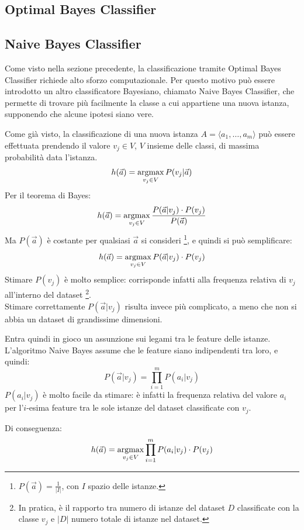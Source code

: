 \subsection{Optimal Bayes Classifier}

\subsection{Naive Bayes Classifier}
Come visto nella sezione precedente, la classificazione tramite Optimal Bayes
Classifier richiede alto sforzo computazionale.
Per questo motivo può essere introdotto un altro classificatore Bayesiano,
chiamato Naive Bayes Classifier, che permette di trovare più facilmente la
classe a cui appartiene una nuova istanza, supponendo che alcune ipotesi siano
vere.

Come già visto, la classificazione di una nuova istanza
$A = \langle a_1, \ldots, a_m \rangle$ può essere effettuata prendendo il valore
$v_j \in V$, $V$ insieme delle classi, di massima probabilità data l'istanza.
\[
    h(\Vec{a}) = \operatorname*{argmax}_{v_j \in V} P(v_j | \Vec{a})
\]
Per il teorema di Bayes:
\[
    h(\Vec{a}) = \operatorname*{argmax}\limits_{v_j \in V} \frac{P(\Vec{a} | v_j) \cdot P(v_j)}{P(\Vec{a})}
\]
Ma $P(\Vec{a})$ è costante per qualsiasi
$\Vec{a}$ si consideri \footnote{$P(\Vec{a}) = \frac{1}{|I|}$,
con $I$ spazio delle istanze.}, e quindi si può semplificare:
\[
    h(\Vec{a}) = \operatorname*{argmax}\limits_{v_j \in V} P(\Vec{a} | v_j) \cdot P(v_j)
\]
Stimare $P(v_j)$ è molto semplice: corrisponde infatti alla frequenza relativa
di $v_j$ all'interno del dataset \footnote{In pratica, è il rapporto tra numero
di istanze del dataset $D$ classificate con la classe $v_j$ e $|D|$ numero
totale di istanze nel dataset.}.\\
Stimare correttamente $P(\Vec{a} | v_j)$ risulta invece più complicato, a meno
che non si abbia un dataset di grandissime dimensioni.

Entra quindi in gioco un assunzione sui legami tra le feature delle istanze.
L'algoritmo Naive Bayes assume che le feature siano indipendenti tra loro, e quindi:
\[
    P(\Vec{a} | v_j) = \prod\limits_{i=1}^m P(a_i | v_j) 
\]
$P(a_i | v_j)$ è molto facile da stimare: è infatti la frequenza relativa del
valore $a_i$ per l'$i$-esima feature tra le sole istanze del dataset
classificate con $v_j$.

Di conseguenza:
\[
    h(\Vec{a}) = \operatorname*{argmax}\limits_{v_j \in V} \prod\limits_{i=1}^m P(a_i | v_j)  \cdot P(v_j)
\]

